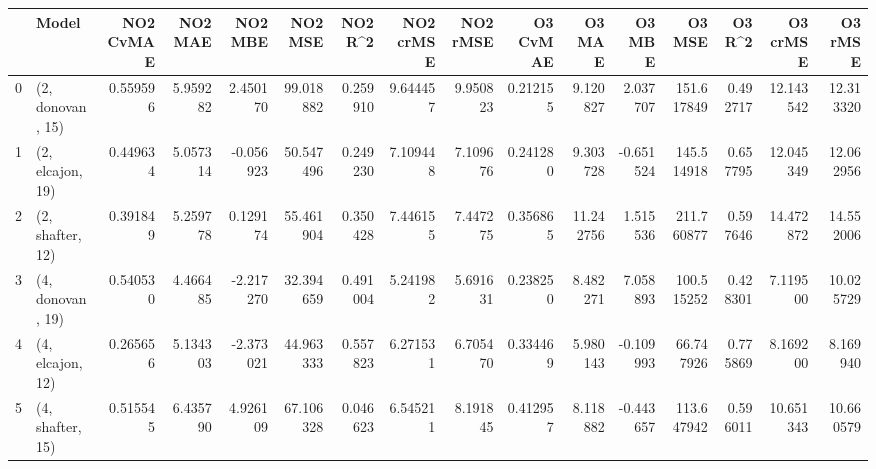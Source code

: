 \begin{tabular}{llrrrrrrrrrrrrrr}
\toprule
{} &             Model &  NO2 CvMAE &   NO2 MAE &   NO2 MBE &    NO2 MSE &   NO2 R\textasciicircum2 &  NO2 crMSE &  NO2 rMSE &  O3 CvMAE &     O3 MAE &    O3 MBE &      O3 MSE &    O3 R\textasciicircum2 &   O3 crMSE &    O3 rMSE \\
\midrule
0 &  (2, donovan, 15) &   0.559596 &  5.959282 &  2.450170 &  99.018882 &  0.259910 &   9.644457 &  9.950823 &  0.212155 &   9.120827 &  2.037707 &  151.617849 &  0.492717 &  12.143542 &  12.313320 \\
1 &  (2, elcajon, 19) &   0.449634 &  5.057314 & -0.056923 &  50.547496 &  0.249230 &   7.109448 &  7.109676 &  0.241280 &   9.303728 & -0.651524 &  145.514918 &  0.657795 &  12.045349 &  12.062956 \\
2 &  (2, shafter, 12) &   0.391849 &  5.259778 &  0.129174 &  55.461904 &  0.350428 &   7.446155 &  7.447275 &  0.356865 &  11.242756 &  1.515536 &  211.760877 &  0.597646 &  14.472872 &  14.552006 \\
3 &  (4, donovan, 19) &   0.540530 &  4.466485 & -2.217270 &  32.394659 &  0.491004 &   5.241982 &  5.691631 &  0.238250 &   8.482271 &  7.058893 &  100.515252 &  0.428301 &   7.119500 &  10.025729 \\
4 &  (4, elcajon, 12) &   0.265656 &  5.134303 & -2.373021 &  44.963333 &  0.557823 &   6.271531 &  6.705470 &  0.334469 &   5.980143 & -0.109993 &   66.747926 &  0.775869 &   8.169200 &   8.169940 \\
5 &  (4, shafter, 15) &   0.515545 &  6.435790 &  4.926109 &  67.106328 &  0.046623 &   6.545211 &  8.191845 &  0.412957 &   8.118882 & -0.443657 &  113.647942 &  0.596011 &  10.651343 &  10.660579 \\
\bottomrule
\end{tabular}
